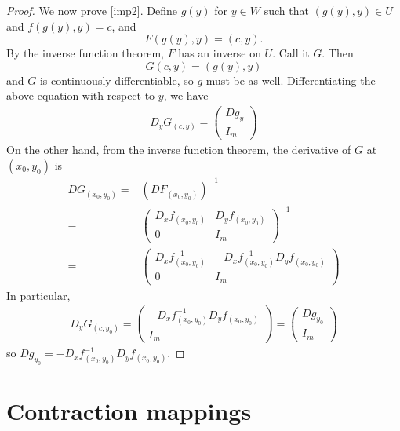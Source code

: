 \begin{proof}
  We now prove \ref{imp2}. Define $g(y)$ for $y \in W$ such that
  $(g(y),y) \in U$ and $f(g(y),y) = c$, and 
  \[ F(g(y),y) = (c,y). \]
  By the inverse function theorem, $F$ has an inverse on $U$. Call it
  $G$. Then
  \[ G(c,y) = (g(y),y) \]
  and $G$ is continuously differentiable, so $g$ must be as
  well. Differentiating the above equation with respect to $y$, we
  have
  \begin{align*}
    D_y G_{(c,y)} = \begin{pmatrix} Dg_y \\ I_m \end{pmatrix} 
  \end{align*}
  On the other hand, from the inverse function theorem, the derivative
  of $G$ at $(x_0,y_0)$ is
  \begin{align*}
    DG_{(x_0,y_0)} = & \left(DF_{(x_0,y_0)} \right)^{-1} \\
    = & \begin{pmatrix} D_xf_{(x_0,y_0)} &  D_yf_{(x_0,y_0)}  \\
      0 & I_m \end{pmatrix}^{-1} \\
    = & \begin{pmatrix} D_xf_{(x_0,y_0)}^{-1} & -D_xf_{(x_0,y_0)}^{-1} D_y
      f_{(x_0,y_0)} \\
      0 & I_m \end{pmatrix}
  \end{align*}
  In particular, 
  \begin{align*}
    D_y G_{(c,y_0)}  = \begin{pmatrix} -D_xf_{(x_0,y_0)}^{-1} D_y
      f_{(x_0,y_0)} \\
      I_m \end{pmatrix} = \begin{pmatrix} Dg_{y_0} \\
      I_m \end{pmatrix} 
  \end{align*}
  so $Dg_{y_0} = -D_xf_{(x_0,y_0)}^{-1} D_y f_{(x_0,y_0)}$.  
\end{proof}

\section{Contraction mappings}

